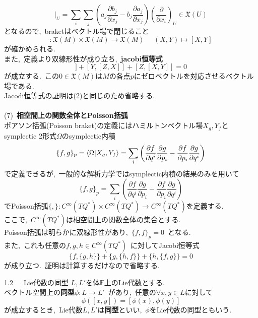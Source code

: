 \documentclass[uplatex,dvipdfmx]{jsarticle}
\begin{document}
\begin{myproof}
\begin{equation*}
    [X,Y]|_U = \sum_i\sum_j \left( a_j\frac{\partial b_j}{\partial x_j}-b_j\frac{\partial a_j}{\partial x_j} \right)\left( \frac{\partial}{\partial x_i} \right)_U\in \mathfrak{X}(U)
\end{equation*}
となるので,~braketはベクトル場で閉じること
\begin{equation*}
    [~,~]:\mathfrak{X}(M)\times \mathfrak{X}(M)\to \mathfrak{X}(M)~~~~~~(X,Y)\mapsto[X,Y]
\end{equation*}が確かめられる.\\
また,~定義より双線形性が成り立ち,~\textbf{jacobi恒等式}
\begin{equation*}
    [X,[Y,Z]]+[Y,[Z,X]]+[Z,[X,Y]]=0
\end{equation*}
が成立する.~この$0\in \mathfrak{X}(M)$は$M$の各点$p$にゼロベクトルを対応させるベクトル場である.\\
Jacodi恒等式の証明は(2)と同じのため省略する.\\\\
(7)~\textbf{相空間上の関数全体とPoisson括弧}\\
ポアソン括弧(Poisson braket)の定義にはハミルトンベクトル場$X_g,Y_f$とsymplectic 2形式$\Omega$のsymplectic内積
\begin{equation*}
    \{f,g\}_p = \ev{\Omega|X_g,Y_f} = \sum_{i}\left( \frac{\partial f}{\partial q^i} \frac{\partial g}{\partial p_i}-\frac{\partial f}{\partial p_i}\frac{\partial g}{\partial q^i}\right)
\end{equation*}
で定義できるが,~一般的な解析力学ではsymplectic内積の結果のみを用いて
\begin{equation*}
    \{f,g\}_p =  \sum_{i}\left( \frac{\partial f}{\partial q^i} \frac{\partial g}{\partial p_i}-\frac{\partial f}{\partial p_i}\frac{\partial g}{\partial q^i}\right)
\end{equation*}
でPoisson括弧$\{,\}:C^\infty (TQ^*)\times C^\infty(TQ^*)\to C^\infty (TQ^*)$を定義する.\\
ここで,~$C^\infty (TQ^*)$は相空間上の関数全体の集合とする.\\
Poisson括弧は明らかに双線形性があり,~$\{f,f\}_p = 0$~となる.\\
また,~これも任意の$f,g,h\in C^\infty(TQ^*)$~に対してJacobi恒等式
\begin{equation*}
    \{f,\{g,h\}\}+\{g,\{h,f\}\}+\{h,\{f,g\}\}=0
\end{equation*}
が成り立つ.~証明は計算するだけなので省略する.
\end{myproof}
\begin{mydef}{1.2~~~Lie代数の同型}
    $L,L'$を体$\mathbb{F}$上のLie代数とする.\\
    ベクトル空間上の\textbf{同型}$\phi:L\to L'$~があり,~任意の$\forall x,y\in L$に対して
    \begin{equation*}
        \phi([x,y])=[\phi(x),\phi(y)]
    \end{equation*}
    が成立するとき,~Lie代数$L,L'$は\textbf{同型}といい,~$\phi$をLie代数の同型ともいう.
\end{mydef}
\newpage
\end{document}
